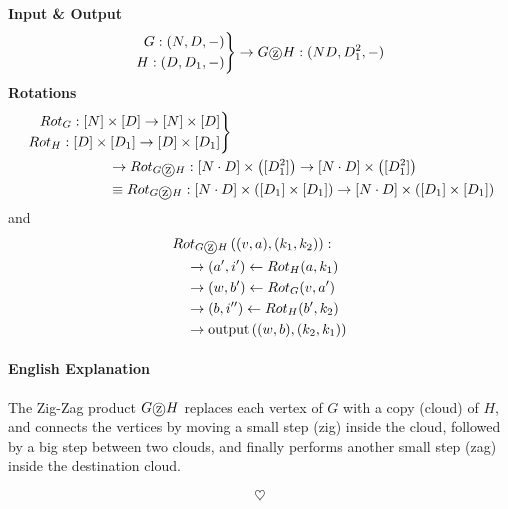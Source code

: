\documentclass[11pt, letter]{book}
\newcommand*\tcircle[1]{%
  \raisebox{-0.5pt}{%
    \textcircled{#1}%
  }%
}
\begin{document}
\begin{definition}
	\textbf{Input \& Output}
	\begin{equation}
		\left. \begin{aligned}
 			G: (N, D, -) \\
 			H: (D, D_1, -) 
 		\end{aligned}\right\rbrace \rightarrow G \tcircle{z} H : (ND, D_1^2, -)
	\end{equation}
	\textbf{Rotations}
	\begin{align}
		&\left. \begin{aligned}
 			Rot_G: [N] \times [D] \rightarrow [N] \times [D] \\
 			Rot_H: [D] \times [D_1] \rightarrow [D] \times [D_1]
 		\end{aligned}\right \rbrace 
 		\\
 		&\quad \quad \quad \quad \quad \quad
 		\rightarrow Rot_{G\tcircle{z} H}: [N\cdot D] \times \left( [D_1^2] \right) \rightarrow [N\cdot D] \times \left( [D_1^2] \right)
 		\\
 		&\quad \quad \quad \quad \quad \quad
 		\equiv Rot_{G\tcircle{z} H}: [N\cdot D] \times \left( [D_1] \times [D_1] \right) \rightarrow [N\cdot D] \times \left( [D_1] \times [D_1] \right)
	\end{align}
	and 
	\begin{align}
		&Rot_{G \tcircle {z}  H} \left ( (v, a) , (k_1, k_2) \right) : \\
		&\quad \rightarrow (a', i') \gets Rot_H(a, k_1) \\
		&\quad \rightarrow (w, b') \gets Rot_G (v, a') \\
		&\quad \rightarrow (b, i'') \gets Rot_H (b', k_2) \\
		&\quad \rightarrow \text{output} \left( (w, b), (k_2, k_1) \right)
	\end{align}
	\paragraph{English Explanation} The Zig-Zag product $G \tcircle{z} H$ replaces each vertex of $G$ with a copy (cloud) of $H$, and connects the vertices by moving a small step (zig) inside the cloud, followed by a big step between two clouds, and finally performs another small step (zag) inside the destination cloud. 
\end{definition}














































\vfill 
\begin{equation*}
	\heartsuit
\end{equation*}
\end{document}
